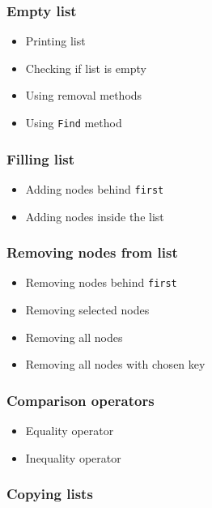 \documentclass{article}
\begin{document}
\subsubsection*{Empty list}

\begin{itemize}
    \item Printing list
    \item Checking if list is empty
    \item Using removal methods
    \item Using {\tt Find} method
\end{itemize}

\subsubsection*{Filling list}

\begin{itemize}
    \item Adding nodes behind {\tt first}
    \item Adding nodes inside the list
\end{itemize}

\subsubsection*{Removing nodes from list}

\begin{itemize}
    \item Removing nodes behind {\tt first}
    \item Removing selected nodes
    \item Removing all nodes
    \item Removing all nodes with chosen key
\end{itemize}

\subsubsection*{Comparison operators}

\begin{itemize}
    \item Equality operator
    \item Inequality operator
\end{itemize}

\subsubsection*{Copying lists}
\end{document}
